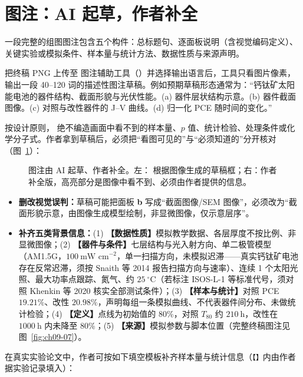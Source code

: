 \section{图注：AI 起草，作者补全}

一段完整的组图图注包含五个构件：总标题句、逐面板说明（含视觉编码定义）、关键实验或模拟条件、样本量与统计方法、数据性质与来源声明。

把终稿 PNG 上传至 \scidraw{} 图注辅助工具（）并选择输出语言后，工具只看图片像素，输出一段 40–120 词的描述性图注草稿。例如预期草稿形态通常为：“钙钛矿太阳能电池的器件结构、截面形貌与光伏性能。(a) 器件层状结构示意。(b) 器件截面图像。(c) 对照与改性器件的 J–V 曲线。(d) 归一化 PCE 随时间的变化。”

按设计原则， 绝不编造画面中看不到的样本量、$p$ 值、统计检验、处理条件或化学分子式。作者拿到草稿后，必须把“看图可见的”与“必须知道的”分开核对（图~\ref{fig:ch09-08}）：

\begin{figure}[htbp]\centering
\resizebox{\linewidth}{!}{}
\caption{图注由 AI 起草、作者补全。左： 根据图像生成的草稿框；右：作者补全版，高亮部分是图像中看不到、必须由作者提供的信息。}\label{fig:ch09-08}
\end{figure}

\begin{itemize}
\item \textbf{删改视觉误判：}草稿可能把面板 \textbf{b} 写成“截面图像/SEM 图像”，必须改为“截面形貌示意，由图像生成模型绘制，非显微图像，仅示意层序”。
\item \textbf{补齐五类背景信息：}(1) \textbf{【数据性质】}模拟教学数据、各层厚度不按比例、非显微图像；(2) \textbf{【器件与条件】}七层结构与光入射方向、单二极管模型（AM1.5G，$100\ \text{mW cm}^{-2}$，单一扫描方向，未模拟迟滞——真实钙钛矿电池存在反常迟滞，须按 Snaith 等 2014 报告扫描方向与速率）、连续 1 个太阳光照、最大功率点跟踪、氮气、约 $25\ ^\circ\text{C}$（若标注 ISOS-L-1 等标准代号，须对照 Khenkin 等 2020 核实全部测试条件）；(3) \textbf{【样本与统计】}对照 PCE $19.21\%$、改性 $20.98\%$，声明每组一条模拟曲线、不代表器件间分布、未做统计检验；(4) \textbf{【定义】}点线为初始值的 80\%，对照 $T_{80}$ 约 $210\ \text{h}$，改性在 $1000\ \text{h}$ 内未降至 80\%；(5) \textbf{【来源】}模拟参数与脚本位置（完整终稿图注见图~\ref{fig:ch09-07}）。
\end{itemize}

在真实实验论文中，作者可按如下填空模板补齐样本量与统计信息（\texttt{【】}内由作者据实验记录填入）：

